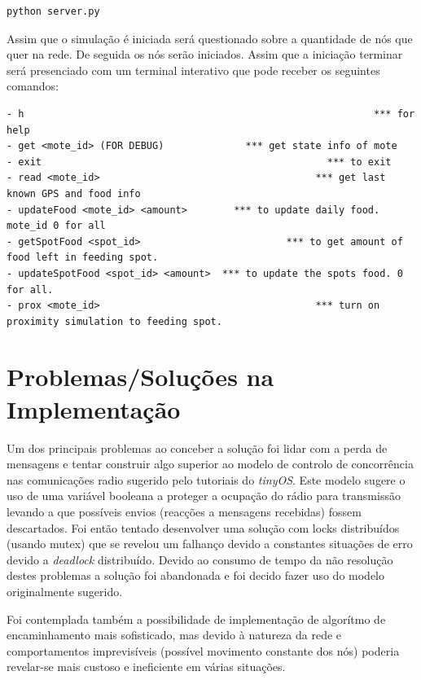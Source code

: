\documentclass[times,10pt,twocolumn]{article}
\begin{document}
\begin{lstlisting}[language=bash]
python server.py
\end{lstlisting}

Assim que o simulação é iniciada será questionado sobre a quantidade de nós que quer na rede. De seguida os nós serão iniciados. Assim que a iniciação terminar será presenciado com um terminal interativo que pode receber os seguintes comandos:

\begin{lstlisting}
- h                                                            *** for help
- get <mote_id> (FOR DEBUG)              *** get state info of mote
- exit                              			       *** to exit
- read <mote_id>                                     *** get last known GPS and food info
- updateFood <mote_id> <amount>        *** to update daily food. mote_id 0 for all
- getSpotFood <spot_id>                         *** to get amount of food left in feeding spot.
- updateSpotFood <spot_id> <amount>  *** to update the spots food. 0 for all.
- prox <mote_id>                                     *** turn on proximity simulation to feeding spot.
\end{lstlisting}

\section{Problemas/Soluções na Implementação}

Um dos principais problemas ao conceber a solução foi lidar com a perda de mensagens e tentar construir algo superior ao modelo de controlo de concorrência nas comunicações radio sugerido pelo tutoriais do \emph{tinyOS}. Este modelo sugere o uso de uma variável booleana a proteger a ocupação do rádio para transmissão levando a que possíveis envios (reacções a mensagens recebidas) fossem descartados. Foi então tentado desenvolver uma solução com locks distribuídos (usando mutex) que se revelou um falhanço devido a constantes situações de erro devido a \emph{deadlock} distribuído. Devido ao consumo de tempo da não resolução destes problemas a solução foi abandonada e foi decido fazer uso do modelo originalmente sugerido.

Foi contemplada também a possibilidade de implementação de algorítmo de encaminhamento mais sofisticado, mas devido à natureza da rede e comportamentos imprevisíveis (possível movimento constante dos nós) poderia revelar-se mais custoso e ineficiente em várias situações.
\end{document}

